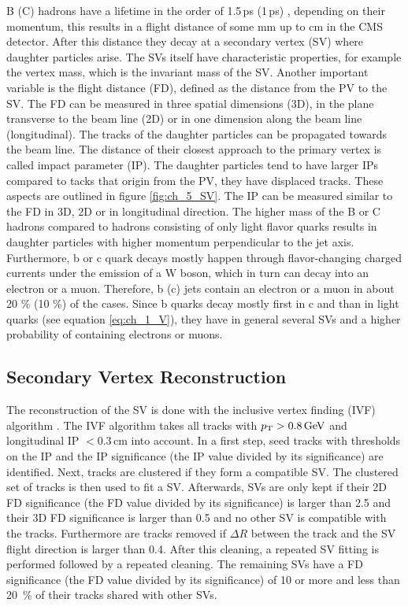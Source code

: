 B (C) hadrons have a lifetime in the order of 1.5\,ps (1\,ps) \cite{HeavyFlavorIdentification}, depending on their momentum, this results in a flight distance of some mm up to cm in the CMS detector. After this distance they decay at a secondary vertex (SV) where daughter particles arise. The SVs itself have characteristic properties, for example the vertex mass, which is the invariant mass of the SV. Another important variable is the flight distance (FD), defined as the distance from the PV to the SV. The FD can be measured in three spatial dimensions (3D), in the plane transverse to the beam line (2D) or in one dimension along the beam line (longitudinal). The tracks of the daughter particles can be propagated towards the beam line. The distance of their closest approach to the primary vertex is called impact parameter (IP). The daughter particles tend to have larger IPs compared to tacks that origin from the PV, they have displaced tracks. These aspects are outlined in figure \ref{fig:ch_5_SV}. The IP can be measured similar to the FD in 3D, 2D or in longitudinal direction. The higher mass of the B or C hadrons compared to hadrons consisting of only light flavor quarks results in daughter particles with higher momentum perpendicular to the jet axis. Furthermore, b or c quark decays mostly happen through flavor-changing charged currents under the emission of a W boson, which in turn can decay into an electron or a muon. Therefore, b (c) jets contain an electron or a muon in about 20 \% (10 \%) \cite{HeavyFlavorIdentification} of the cases. Since b quarks decay mostly first in c and than in light quarks (see equation \ref{eq:ch_1_V}), they have in general several SVs and a higher probability of containing electrons or muons. 

\subsection{Secondary Vertex Reconstruction}
The reconstruction of the SV is done with the inclusive vertex finding (IVF) algorithm \cite{IVF}. The IVF algorithm takes all tracks with $p_\mathrm{T} > 0.8\, \mathrm{GeV}$ and longitudinal IP $< 0.3\, $cm into account. In a first step, seed tracks with thresholds on the IP and the IP significance (the IP value divided by its significance) are identified. Next, tracks are clustered if they form a compatible SV. The clustered set of tracks is then used to fit a SV. Afterwards, SVs are only kept if their 2D FD significance (the FD value divided by its significance) is larger than 2.5 and their 3D FD significance is larger than 0.5 and no other SV is compatible with the tracks. Furthermore are tracks removed if $\Delta R$ between the track and the SV flight direction is larger than 0.4. After this cleaning, a repeated SV fitting is performed followed by a repeated cleaning. The remaining SVs have a FD significance (the FD value divided by its significance) of 10 or more and less than 20\ \% of their tracks shared with other SVs.\\

